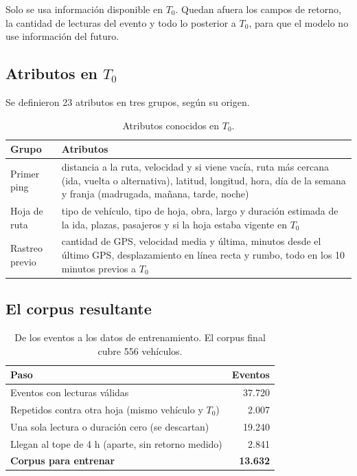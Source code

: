 \documentclass[11pt,a4paper]{article}
\begin{document}
Solo se usa información disponible en $T_0$. Quedan afuera los campos de retorno, la cantidad de
lecturas del evento y todo lo posterior a $T_0$, para que el modelo no use información del futuro.

\subsection{Atributos en $T_0$}

Se definieron 23 atributos en tres grupos, según su origen.

\begin{table}[h]
  \centering
  \begin{tabular}{@{}lp{10.5cm}@{}}
    \toprule
    \textbf{Grupo} & \textbf{Atributos} \\
    \midrule
    Primer ping &
      distancia a la ruta, velocidad y si viene vacía, ruta más cercana (ida, vuelta o alternativa),
      latitud, longitud, hora, día de la semana y franja (madrugada, mañana, tarde, noche) \\
    Hoja de ruta &
      tipo de vehículo, tipo de hoja, obra, largo y duración estimada de la ida, plazas, pasajeros y si la
      hoja estaba vigente en $T_0$ \\
    Rastreo previo &
      cantidad de GPS, velocidad media y última, minutos desde el último GPS, desplazamiento en línea
      recta y rumbo, todo en los 10 minutos previos a $T_0$ \\
    \bottomrule
  \end{tabular}
  \caption{Atributos conocidos en $T_0$.}
\end{table}

\newpage
\subsection{El corpus resultante}

\begin{table}[h]
  \centering
  \begin{tabular}{@{}lr@{}}
    \toprule
    \textbf{Paso} & \textbf{Eventos} \\
    \midrule
    Eventos con lecturas válidas                       & 37.720 \\
    Repetidos contra otra hoja (mismo vehículo y $T_0$) & 2.007 \\
    Una sola lectura o duración cero (se descartan)    & 19.240 \\
    Llegan al tope de 4 h (aparte, sin retorno medido) & 2.841 \\
    \midrule
    \textbf{Corpus para entrenar}                      & \textbf{13.632} \\
    \bottomrule
  \end{tabular}
  \caption{De los eventos a los datos de entrenamiento. El corpus final cubre 556 vehículos.}
\end{table}
\end{document}
